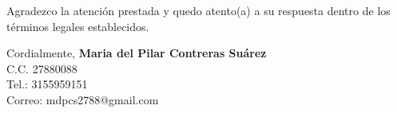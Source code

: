 \documentclass[11pt]{article}
\begin{document}


\vspace{0.3cm}

\noindent Agradezco la atención prestada y quedo atento(a) a su respuesta dentro de los términos legales establecidos.

\noindent Cordialmente,
\textbf{Maria del Pilar Contreras Suárez}\\
C.C. 27880088\\
Tel.: 3155959151\\
Correo: mdpcs2788@gmail.com
\end{document}
